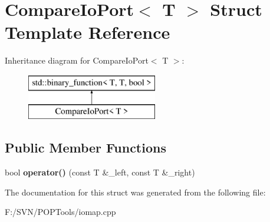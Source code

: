 \hypertarget{struct_compare_io_port}{\section{Compare\-Io\-Port$<$ T $>$ Struct Template Reference}
\label{struct_compare_io_port}
}
Inheritance diagram for Compare\-Io\-Port$<$ T $>$\-:\begin{figure}[H]
\begin{center}
\leavevmode
\includegraphics[height=2.000000cm]{struct_compare_io_port}
\end{center}
\end{figure}
\subsection*{Public Member Functions}
\begin{DoxyCompactItemize}
\item 
\hypertarget{struct_compare_io_port_af56b8177ac8b7d8faedfbd8e0a472b22}{bool {\bfseries operator()} (const T \&\-\_\-left, const T \&\-\_\-right)}\label{struct_compare_io_port_af56b8177ac8b7d8faedfbd8e0a472b22}

\end{DoxyCompactItemize}


The documentation for this struct was generated from the following file\-:\begin{DoxyCompactItemize}
\item 
F\-:/\-S\-V\-N/\-P\-O\-P\-Tools/iomap.\-cpp\end{DoxyCompactItemize}

